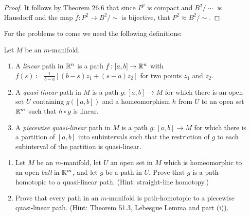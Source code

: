 \begin{proof}
It follows by Theorem 26.6 that since $P^2$ is compact and $B^2/{\sim}$ is
Hausdorff and the map $\bar f\colon P^2\to B^2/{\sim}$ is bijective, that
$P^2\approx B^2/{\sim}$.
\end{proof}
\newpage
\thispagestyle{empty}
For the problems to come we need the following definitions:
\begin{definition*}
Let $M$ be an  $m$-manifold.
\begin{enumerate}[label=(\roman*)]
\item A \emph{linear} path in $\mathbb{R}^n$ is a path $f\colon[a,b]\to\mathbb{R}^n$ with
  $f(s)\coloneqq\tfrac{1}{b-a}[(b-s)z_1+(s-a)z_2]$ for two points $z_1$ and $z_2$.
\item A \emph{quasi-linear} path in $M$ is a path $g\colon[a,b]\to M$ for
  which there is an open set $U$ containing $g([a,b])$ and a homeomorphism
  $h$ from $U$ to an open set $\mathbb{R}^m$ such that $h\circ g$ is linear.
\item A \emph{piecewise quasi-linear} path in $M$ is a path
  $g\colon[a,b]\to M$ for which there is a partition of $[a,b]$ into
  subintervals such that the restriction of $g$ to each subinterval of the
  partition is  quasi-linear.
\end{enumerate}
\end{definition*}
\newpage
\begin{problem}[A]
\begin{enumerate}[label=(\roman*)]
\item Let $M$ be an $m$-manifold, let $U$ an open set in $M$ which is
  homeomorphic to an open \emph{ball} in $\mathbb{R}^m$, and let $g$ be a path in
  $U$. Prove that $g$ is a path-homotopic to a quasi-linear path. (Hint:
  straight-line homotopy.)
\item Prove that every path in an $m$-manifold is path-homotopic to a
  piecewise quasi-linear path. (Hint: Theorem 51.3, Lebesgue Lemma and part
  (i)).
\end{enumerate}
\end{problem}
